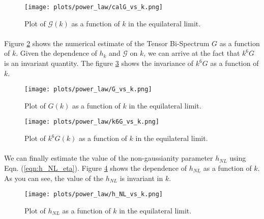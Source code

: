 \documentclass[12pt,a4paper,oneside]{book}
\begin{document}
\begin{figure}
\begin{center}
\texttt{[image: plots/power\_law/calG\_vs\_k.png]}
\caption[Plot of $\mathcal{G}(k)$ as a function of $k$ in the equilateral limit in power law inflation.]
{Plot of $\mathcal{G}(k)$ as a function of $k$ in the equilateral limit.}
\label{fig:eq_calG_vs_k}
\end{center}
\end{figure}

\paragraph*{} Figure \ref{fig:eq_G_vs_k} 
shows the numerical estimate of the Tensor Bi-Spectrum $G$ as a function of $k$. Given the dependence 
of $h_k$ and $\mathcal{G}$ on $k$, we can arrive at the fact that $k^6G$ is an invariant quantity. The figure 
\ref{fig:eq_k6G_vs_k} shows the invariance of $k^6G$ as a function of $k$.

\begin{figure}
\begin{center}
\texttt{[image: plots/power\_law/G\_vs\_k.png]}
\caption[Plot of $G(k)$ as a function of $k$ in the equilateral limit in power law inflation.]
{Plot of $G(k)$ as a function of $k$ in the equilateral limit.}
\label{fig:eq_G_vs_k}
\end{center}
\end{figure}

\begin{figure}
\begin{center}
\texttt{[image: plots/power\_law/k6G\_vs\_k.png]}
\caption[Plot of $k^6G(k)$ as a function of $k$ in the equilateral limit in power law inflation.]
{Plot of $k^6G(k)$ as a function of $k$ in the equilateral limit.}
\label{fig:eq_k6G_vs_k}
\end{center}
\end{figure}

\paragraph*{} We can finally estimate the value of the non-gaussianity parameter $h_{NL}$ using Eqn. (\ref{eqn:h_NL_eta}). 
Figure \ref{fig:eq_h_NL_vs_k} shows the dependence of $h_{NL}$ as a function of $k$. As you can see, the value of the 
$h_{NL}$ is invariant in $k$.

\begin{figure}
\begin{center}
\texttt{[image: plots/power\_law/h\_NL\_vs\_k.png]}
\caption[Plot of $h_{NL}$ as a function of $k$ in the equilateral limit in power law inflation.]
{Plot of $h_{NL}$ as a function of $k$ in the equilateral limit.}
\label{fig:eq_h_NL_vs_k}
\end{center}
\end{figure}
\end{document}
